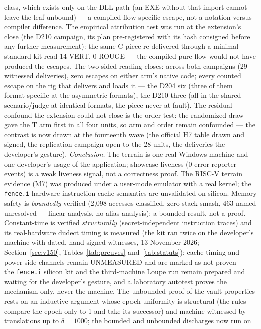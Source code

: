 \documentclass[10pt,a4paper]{article}
\newcommand{\code}[1]{\texttt{\small #1}}
\begin{document}
class, which exists only on the DLL path (an EXE without that import
cannot leave the leaf unbound) --- a compiled-flow-specific escape,
not a notation-versus-compiler difference. The empirical
attribution test was run at the extension's close (the D210 campaign,
its plan pre-registered with its hash consigned before any further
measurement): the same C piece re-delivered through a minimal
standard kit read 14 VERT, 0 ROUGE --- the compiled pure flow would
not have produced the escapes. The two-sided reading closes: across
both campaigns (29 witnessed deliveries), zero escapes on either
arm's native code; every counted escape on the rig that delivers and
loads it --- the D204 six (three of them format-specific at the
asymmetric formats), the D210 three (all in the shared scenario/judge
at identical formats, the piece never at fault). The residual
confound the extension could not close is the order test: the
randomized draw gave the T arm first in all four units, so arm and
order remain confounded --- the contrast is now drawn at the fourteenth
wave (the official H7 table drawn and signed, the replication campaign
open to the 28 units, the deliveries the developer's gesture).
\emph{Conclusion.} The terrain is one real Windows machine and one
developer's usage of the application; showcase liveness (0 error-reporter
events) is a weak liveness signal, not a correctness proof. The RISC-V terrain
evidence (M7) was produced under a user-mode emulator with a real
kernel; the \code{fence.i} hardware instruction-cache semantics are
unvalidated on silicon. Memory safety
is \emph{boundedly} verified (2{,}098 accesses classified, zero
stack-smash, 463 named unresolved --- linear analysis, no alias
analysis): a bounded result, not a proof. Constant-time is verified
\emph{structurally} (secret-independent instruction traces) and its
real-hardware dudect timing is measured (the kit ran twice on the
developer's machine with dated, hand-signed witnesses, 13 November 2026;
Section~\ref{sec:v150}, Tables~\ref{tab:preuves} and~\ref{tab:statuts});
cache-timing and power side channels remain
UNMEASURED and are marked as not proven --- the \code{fence.i} silicon kit
and the third-machine Loupe run remain prepared and waiting for the
developer's gesture, and a laboratory autotest
proves the mechanism only, never the machine. The unbounded proof of
the vault properties rests on an inductive argument whose
epoch-uniformity is structural (the rules compare the epoch only to
1 and take its successor) and machine-witnessed by translations up
to $\delta = 1000$; the bounded and unbounded discharges now run on
\end{document}
